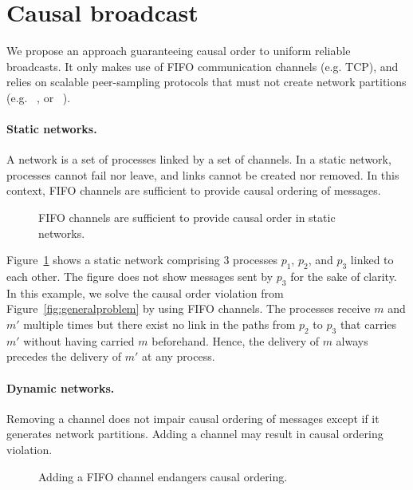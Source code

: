
\section{Causal broadcast}
\label{sec:proposal}

We propose an approach guaranteeing causal order to uniform reliable
broadcasts. It only makes use of FIFO communication channels (e.g. TCP), and
relies on scalable peer-sampling protocols that must not create network partitions
(e.g. \SPRAY~\cite{nedelec2017adaptive}, or \CYCLON~\cite{voulgaris2005cyclon}).

\paragraph{Static networks.} A network is a set of processes linked by a set of
channels. In a static network, processes cannot fail nor leave, and links cannot
be created nor removed. In this context, FIFO channels are sufficient to provide
causal ordering of messages.

\begin{figure}
  \begin{center}
    
    \caption{\label{fig:static}FIFO channels are sufficient to provide causal
      order in static networks.}
  \end{center}
\end{figure}

Figure~\ref{fig:static} shows a static network comprising 3 processes $p_1$,
$p_2$, and $p_3$ linked to each other. The figure does not show messages sent by
$p_3$ for the sake of clarity. In this example, we solve the causal order
violation from Figure~\ref{fig:generalproblem} by using FIFO channels. The
processes receive $m$ and $m'$ multiple times but there exist no link in the
paths from $p_2$ to $p_3$ that carries $m'$ without having carried $m$
beforehand. Hence, the delivery of $m$ always precedes the delivery of $m'$ at
any process.

\paragraph{Dynamic networks.} Removing a channel does not impair causal ordering
of messages except if it generates network partitions.  Adding a channel may
result in causal ordering violation.


\begin{figure}
  \begin{center}
    
    \caption{\label{fig:problem}Adding a FIFO channel endangers causal
      ordering.}
  \end{center}
\end{figure}

